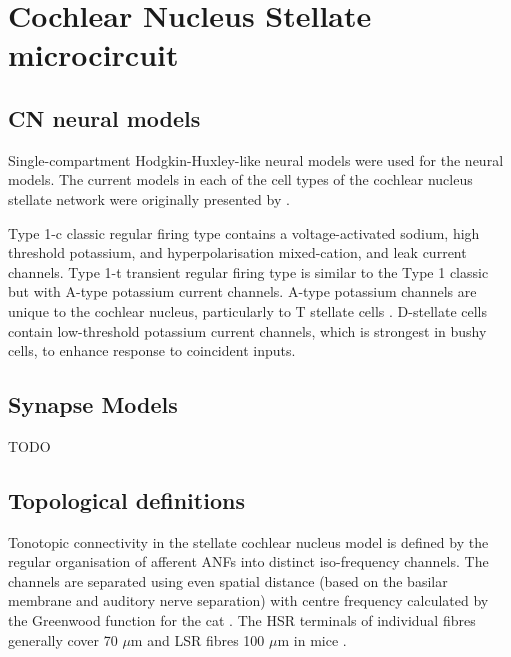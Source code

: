 

\section{Cochlear Nucleus Stellate microcircuit \label{sec:CN:cochl-nucl-stell}}

\subsection{CN neural models}

Single-compartment Hodgkin-Huxley-like neural models were used for the neural models.
The current models in each of the cell types of the cochlear nucleus stellate network were originally presented by \citet{RothmanManis:2003b}.


Type 1-c classic regular firing type contains a voltage-activated sodium, high threshold potassium, and hyperpolarisation mixed-cation, and leak current channels.
Type 1-t transient regular firing type is similar to the Type 1 classic but with A-type potassium current channels.
A-type potassium channels are unique to the cochlear nucleus, particularly to T stellate cells \citep{RothmanManis:2003,RothmanManis:2003a,RothmanManis:2003b}.
D-stellate cells contain low-threshold potassium current channels, which is strongest in bushy cells, to enhance response to coincident inputs.




\subsection{Synapse Models}

TODO

\subsection{Topological definitions    \label{sec:CN:tonot-conn}}

Tonotopic connectivity in the stellate cochlear nucleus model is defined by the regular organisation of afferent ANFs into distinct iso-frequency channels.
The channels are separated using even spatial distance (based on the basilar membrane and auditory nerve separation) with centre frequency calculated by the Greenwood function for the cat \citep[see~\ref{tab:ModelSummary},]{Greenwood:1990}.
The HSR terminals of individual fibres generally cover 70 $\mu$m and LSR fibres 100 $\mu$m in mice \citep{OertelWuEtAl:1988,OertelWu:1989}.

